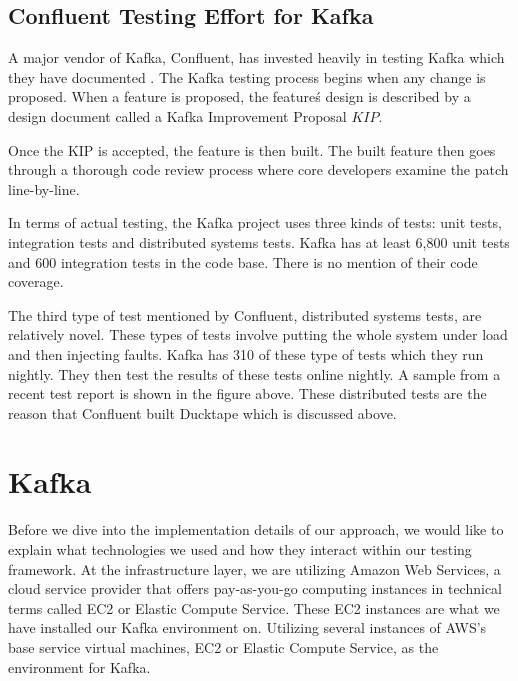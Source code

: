 \begin{multicols}{2}
\subsection{Confluent Testing Effort for Kafka}

A major vendor of Kafka, Confluent, has invested heavily in testing Kafka which they have documented \cite{confluenttesting}.
The Kafka testing process begins when any change is proposed.
When a feature is proposed, the feature\'s design is described by a design document called a Kafka Improvement Proposal \(KIP\).

\vspace{1em}
\vspace{1em}
Once the KIP is accepted, the feature is then built.
The built feature then goes through a thorough code review process where core developers examine the patch line-by-line.

In terms of actual testing, the Kafka project uses three kinds of tests: unit tests, integration tests and distributed systems tests.
Kafka has at least 6,800 unit tests and 600 integration tests in the code base.
There is no mention of their code coverage.

The third type of test mentioned by Confluent, distributed systems tests, are relatively novel.
These types of tests involve putting the whole system under load and then injecting faults.
Kafka has 310 of these type of tests which they run nightly.
They then test the results of these tests online nightly.
A sample from a recent test report is shown in the figure above.
These distributed tests are the reason that Confluent built Ducktape which is discussed above.

\section{Kafka}

Before we dive into the implementation details of our approach, we would like to explain what technologies we used and how they interact within our testing framework.
At the infrastructure layer, we are utilizing Amazon Web Services, a cloud service provider that offers pay-as-you-go computing instances in technical terms called EC2 or Elastic Compute Service.
These EC2 instances are what we have installed our Kafka environment on.
Utilizing several instances of AWS’s base service virtual machines, EC2 or Elastic Compute Service, as the environment for Kafka.


\end{multicols}

